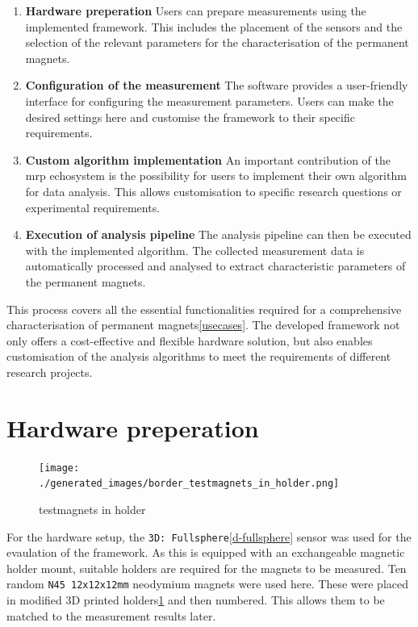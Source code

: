 \begin{enumerate}
\def\labelenumi{\arabic{enumi}.}
\item
  \textbf{Hardware preperation} Users can prepare measurements using the
  implemented framework. This includes the placement of the sensors and
  the selection of the relevant parameters for the characterisation of
  the permanent magnets.
\item
  \textbf{Configuration of the measurement} The software provides a
  user-friendly interface for configuring the measurement parameters.
  Users can make the desired settings here and customise the framework
  to their specific requirements.
\item
  \textbf{Custom algorithm implementation} An important contribution of
  the \gls{mrp} echosystem is the possibility for users to implement
  their own algorithm for data analysis. This allows customisation to
  specific research questions or experimental requirements.
\item
  \textbf{Execution of analysis pipeline} The analysis pipeline can then
  be executed with the implemented algorithm. The collected measurement
  data is automatically processed and analysed to extract characteristic
  parameters of the permanent magnets.
\end{enumerate}

This process covers all the essential functionalities required for a
comprehensive characterisation of permanent magnets\ref{usecases}. The
developed framework not only offers a cost-effective and flexible
hardware solution, but also enables customisation of the analysis
algorithms to meet the requirements of different research projects.

\hypertarget{hardware-preperation}{%
\section{Hardware preperation}\label{hardware-preperation}}

\begin{figure}
\centering
\texttt{[image: ./generated\_images/border\_testmagnets\_in\_holder.png]}
\caption{testmagnets in holder \label{testmagnets_in_holder.png}}
\end{figure}

For the hardware setup, the
\passthrough{\lstinline!3D: Fullsphere!}\ref{d-fullsphere} sensor was
used for the evaulation of the framework. As this is equipped with an
exchangeable magnetic holder mount, suitable holders are required for
the magnets to be measured. Ten random
\passthrough{\lstinline!N45 12x12x12mm!} neodymium magnets were used
here. These were placed in modified 3D printed
holders\ref{testmagnets_in_holder.png} and then numbered. This allows
them to be matched to the measurement results later.


